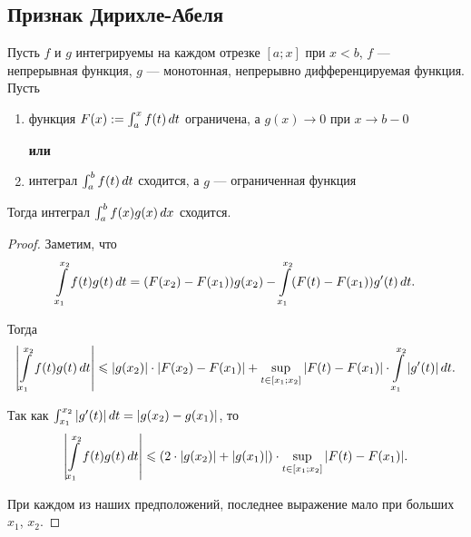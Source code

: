 \documentclass[a4paper]{article}
\theoremstyle{named}
\renewcommand{\int}{\intop}
\begin{document}
        \subsection{Признак Дирихле-Абеля}

        \begin{theorem*}
            Пусть $f$ и $g$ интегрируемы на каждом отрезке $[a; x]$ при $x < b$, $f$ --- непрерывная функция, $g$ --- монотонная, непрерывно дифференцируемая функция. Пусть
            \begin{enumerate}
            \item
                функция $F(x) := \int_a^x f(t) \dd t$ ограничена, а $g(x) \to 0$ при $x \to b - 0$

            \textbf{или}

            \item
                интеграл $\int_a^b f(t) \dd t$ сходится, а $g$ --- ограниченная функция
            \end{enumerate}

            Тогда интеграл $\int_a^b f(x)g(x) \dd x$ сходится.
        \end{theorem*}

        \begin{proof}
            Заметим, что
            \begin{equation*}
                \int_{x_1}^{x_2} f(t) g(t) \dd t = (F(x_2) - F(x_1))g(x_2) - \int_{x_1}^{x_2} (F(t) - F(x_1))g'(t) \dd t.
            \end{equation*}

            Тогда
            \begin{equation*}
                \left|\int_{x_1}^{x_2} f(t) g(t) \dd t\right| \leq |g(x_2)| \cdot |F(x_2) - F(x_1)| + \sup\limits_{t \in [x_1; x_2]} |F(t) - F(x_1)| \cdot \int_{x_1}^{x_2} |g'(t)| \dd t.
            \end{equation*}

            Так как $\int_{x_1}^{x_2} |g'(t)| \dd t = |g(x_2) - g(x_1)|$, то
            \begin{equation*}
                \left|\int_{x_1}^{x_2} f(t) g(t) \dd t\right| \leq (2 \cdot |g(x_2)| + |g(x_1)|) \cdot \sup\limits_{t \in [x_1; x_2]} |F(t) - F(x_1)|.
            \end{equation*}

            При каждом из наших предположений, последнее выражение мало при больших $x_1$, $x_2$.
        \end{proof}
        
\end{document}

